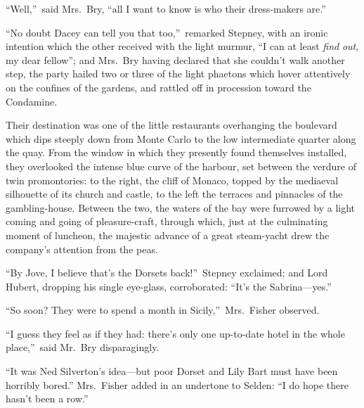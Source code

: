 \documentclass[12pt,a4paper]{book}
\begin{document}
``Well,''\ said Mrs.\ Bry, ``all I want to know is who their
dress-makers are.''





``No doubt Dacey can tell you that too,''\ remarked Stepney, with an
ironic intention which the other received with the light murmur,
``I can at least \textit{find} \textit{out}, my dear fellow''; and Mrs.\ Bry
having declared that she couldn't walk another step, the party
hailed two or three of the light phaetons which hover attentively
on the confines of the gardens, and rattled off in procession
toward the Condamine.





Their destination was one of the little restaurants overhanging
the boulevard which dips steeply down from Monte Carlo to the low
intermediate quarter along the quay. From the window in which
they presently found themselves installed, they overlooked the
intense blue curve of the harbour, set between the verdure of
twin promontories: to the right, the cliff of Monaco, topped by
the mediaeval silhouette of its church and castle, to the left
the terraces and pinnacles of the gambling-house. Between the
two, the waters of the bay were furrowed by a light coming and
going of pleasure-craft, through which, just at the culminating
moment of luncheon, the majestic advance of a great steam-yacht
drew the company's attention from the peas.





``By Jove, I believe that's the Dorsets back!''\ Stepney exclaimed;
and Lord Hubert, dropping his single eye-glass, corroborated: 
``It's the Sabrina---yes.''





``So soon? They were to spend a month in Sicily,''\ Mrs.\ Fisher
observed.





``I guess they feel as if they had: there's only one up-to-date
hotel in the whole place,''\ said Mr.\ Bry disparagingly.





``It was Ned Silverton's idea---but poor Dorset and Lily Bart must
have been horribly bored.'' Mrs.\ Fisher added in an undertone to
Selden: ``I do hope there hasn't been a row.''
\end{document}
